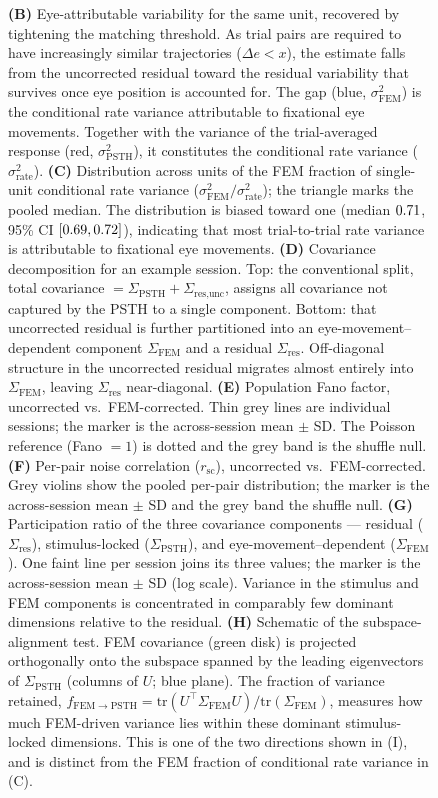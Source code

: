 \documentclass{lite}
\newcommand{\Cpsth}{\Sigma_{\text{PSTH}}}
\newcommand{\Cfem}{\Sigma_{\text{FEM}}}
\begin{document}
\begin{figure}[!t]
  \ContinuedFloat
  \captionsetup{font=footnotesize,singlelinecheck=false}
  \caption{
  \textbf{(B)} Eye-attributable variability for the same unit, recovered by tightening the matching threshold. As trial pairs are required to have increasingly similar trajectories ($\Delta e < x$), the estimate falls from the uncorrected residual toward the residual variability that survives once eye position is accounted for. The gap (blue, $\sigma^2_{\text{FEM}}$) is the conditional rate variance attributable to fixational eye movements. Together with the variance of the trial-averaged response (red, $\sigma^2_{\text{PSTH}}$), it constitutes the conditional rate variance ($\sigma^2_{\text{rate}}$).
  \textbf{(C)} Distribution across units of the FEM fraction of single-unit conditional rate variance ($\sigma^2_{\text{FEM}}/\sigma^2_{\text{rate}}$); the triangle marks the pooled median. The distribution is biased toward one (median $0.71$, 95\% CI $[0.69, 0.72]$), indicating that most trial-to-trial rate variance is attributable to fixational eye movements.
  \textbf{(D)} Covariance decomposition for an example session. Top: the conventional split, total covariance $= \Cpsth + \Sigma_{\text{res}, \text{unc}}$, assigns all covariance not captured by the PSTH to a single component. Bottom: that uncorrected residual is further partitioned into an eye-movement--dependent component $\Cfem$ and a residual $\Sigma_{\text{res}}$. Off-diagonal structure in the uncorrected residual migrates almost entirely into $\Cfem$, leaving $\Sigma_{\text{res}}$ near-diagonal.
  \textbf{(E)} Population Fano factor, uncorrected vs.\ FEM-corrected. Thin grey lines are individual sessions; the marker is the across-session mean $\pm$ SD. The Poisson reference (Fano $=1$) is dotted and the grey band is the shuffle null.
  \textbf{(F)} Per-pair noise correlation ($r_\mathrm{sc}$), uncorrected vs.\ FEM-corrected. Grey violins show the pooled per-pair distribution; the marker is the across-session mean $\pm$ SD and the grey band the shuffle null.
  \textbf{(G)} Participation ratio of the three covariance components --- residual ($\Sigma_{\text{res}}$), stimulus-locked ($\Cpsth$), and eye-movement--dependent ($\Cfem$). One faint line per session joins its three values; the marker is the across-session mean $\pm$ SD (log scale). Variance in the stimulus and FEM components is concentrated in comparably few dominant dimensions relative to the residual.
  \textbf{(H)} Schematic of the subspace-alignment test. FEM covariance (green disk) is projected orthogonally onto the subspace spanned by the leading eigenvectors of $\Cpsth$ (columns of $U$; blue plane). The fraction of variance retained, $f_{\mathrm{FEM}\to\mathrm{PSTH}} = \mathrm{tr}(U^\top\Cfem U)/\mathrm{tr}(\Cfem)$, measures how much FEM-driven variance lies within these dominant stimulus-locked dimensions. This is one of the two directions shown in (I), and is distinct from the FEM fraction of conditional rate variance in (C).
}
\end{figure}
\end{document}
